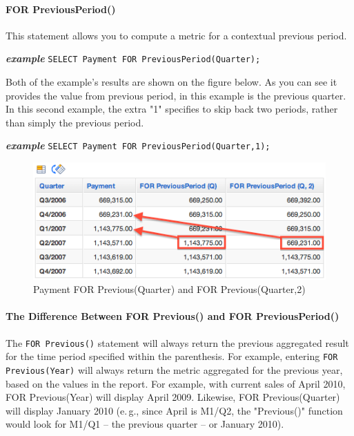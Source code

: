 \documentclass[a4paper, 12pt, titlepage, fleqn]{article}
\begin{document}
\paragraph*{FOR PreviousPeriod()} This statement allows you to compute a metric for a contextual previous period.

\textbf{\emph{example}}  \hspace{.9cm}\verb=SELECT Payment FOR PreviousPeriod(Quarter);=

\noindent Both of the example's results are shown on the figure below. As you can see it provides the value from previous period, in this example is the previous quarter. In this second example, the extra "1" specifies to skip back two periods, rather than simply the previous period.

\textbf{\emph{example}}  \hspace{.9cm}\verb=SELECT Payment FOR PreviousPeriod(Quarter,1);=\\

\begin{figure}[htb]
\centering
\includegraphics[scale=0.6]{images/4pp2.png}
\caption{Payment FOR Previous(Quarter) and FOR Previous(Quarter,2)}
\label{fig:4pq2}
\end{figure}

\paragraph*{The Difference Between FOR Previous() and FOR PreviousPeriod()\\}

The \verb=FOR Previous()= statement will always return the previous aggregated result for the time period specified within the parenthesis. For example, entering \verb=FOR Previous(Year)= will always return the metric aggregated for the previous year, based on the values in the report. For example, with current sales of April 2010, FOR Previous(Year) will display April 2009. Likewise, FOR Previous(Quarter) will display January 2010 (e.\,g., since April is M1/Q2, the "Previous()" function would look for M1/Q1 -- the previous quarter -- or January 2010).
\end{document}
